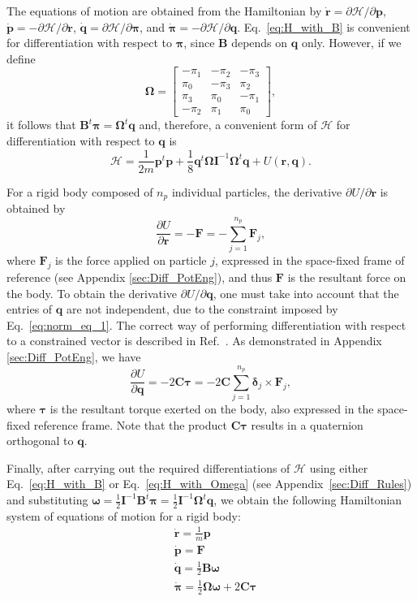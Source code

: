 \documentclass[aip,jcp,reprint,amsmath,amssymb,raggedbottom]{revtex4-1}
\newcommand{\mt}[1]{\boldsymbol{\mathbf{#1}}}           %
\newcommand{\vt}[1]{\boldsymbol{\mathbf{#1}}}           %
\newcommand{\tr}[1]{#1^t}                               %
\newcommand{\diff}[2]{\dfrac{\partial #1}{\partial #2}} %
\begin{document}
The equations of motion are obtained from the Hamiltonian by $\dot{\vt r} = \partial \mathcal{H} / \partial \vt p$, $\dot{\vt p} = -\partial \mathcal{H} / \partial \vt r$, $\dot{\vt q} = \partial \mathcal{H} / \partial \vt \pi$, and $\dot{\vt \pi} = -\partial \mathcal{H} / \partial \vt q$.\cite{Goldstein2002} Eq.~\ref{eq:H_with_B} is convenient for differentiation with respect to $\vt \pi$, since $\mt B$ depends on $\vt q$ only. However, if we define
\[
\mt \Omega = \left[
\begin{array}{rrrr}
-\pi_1 & -\pi_2 & -\pi_3 \\
 \pi_0 & -\pi_3 &  \pi_2 \\
 \pi_3 &  \pi_0 & -\pi_1 \\
-\pi_2 &  \pi_1 &  \pi_0
\end{array}
\right],
\]
it follows that $\tr{\mt B}{\vt \pi} = \tr{\mt \Omega}{\vt q}$ and, therefore, a convenient form of $\mathcal{H}$ for differentiation with respect to $\vt q$ is
\begin{equation}
\label{eq:H_with_Omega}
\mathcal{H} = \frac{1}{2m} \tr{\vt p} \vt p + \frac{1}{8} \tr{\vt q} {\mt \Omega} {\mt I}^{-1} \tr{\mt \Omega} \vt q + U(\vt r, \vt q).
\end{equation}

For a rigid body composed of $n_p$ individual particles, the derivative $\partial U/\partial \vt r$ is obtained by
\[
\diff{U}{\vt r} = -\vt F = -\sum_{j=1}^{n_p} {\vt F_j},
\]
where $\vt F_j$ is the force applied on particle $j$, expressed in the space-fixed frame of reference (see Appendix \ref{sec:Diff_PotEng}), and thus $\vt F$ is the resultant force on the body. To obtain the derivative $\partial U/\partial \vt q$, one must take into account that the entries of $\vt q$ are not independent, due to the constraint imposed by Eq.~\ref{eq:norm_eq_1}. The correct way of performing differentiation with respect to a constrained vector is described in Ref.~. As demonstrated in Appendix \ref{sec:Diff_PotEng}, we have
\[
\diff{U}{\vt q} = -2 \mt C \vt \tau = -2 \mt C \sum_{j=1}^{n_p} {\vt \delta_j} \times {\vt F_j},
\]
where $\vt \tau$ is the resultant torque exerted on the body, also expressed in the space-fixed reference frame. Note that the product $\mt C \vt \tau$ results in a quaternion orthogonal to $\vt q$.

Finally, after carrying out the required differentiations of $\mathcal{H}$ using either Eq.~\ref{eq:H_with_B} or Eq.~\ref{eq:H_with_Omega} (see Appendix~\ref{sec:Diff_Rules}) and substituting $\vt \omega = \frac{1}{2} {\mt I}^{-1} \tr{\mt B} \vt \pi = \frac{1}{2} {\mt I}^{-1} \tr{\mt \Omega} \vt q$, we obtain the following Hamiltonian system of equations of motion for a rigid body:
\begin{subequations}
\label{eq:EDO_system}
\begin{align}
&\dot{\vt r} = \frac{1}{m} \vt p \\
&\dot{\vt p} = \mt F \\
&\dot{\vt q} = \frac{1}{2} \mt B \vt \omega \\
&\dot{\vt \pi} = \frac{1}{2} \mt \Omega \vt \omega + 2 \mt C \vt \tau
\end{align}
\end{subequations}
\end{document}
